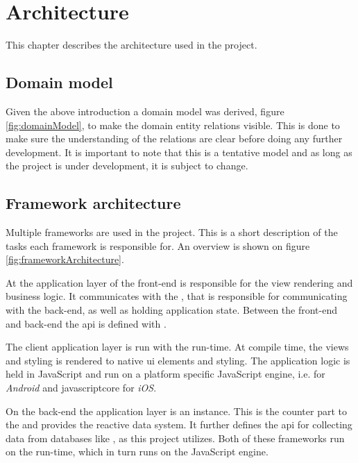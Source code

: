 \chapter{Architecture}
This chapter describes the architecture used in the project.

\section{Domain model}
Given the above introduction a domain model was derived, figure \ref{fig:domainModel}, to make the domain entity relations visible.
This is done to make sure the understanding of the relations are clear before doing any further development.
It is important to note that this is a tentative model and as long as the project is under development, it is subject to change.


\section{Framework architecture}
Multiple frameworks are used in the project.
This is a short description of the tasks each framework is responsible for.
An overview is shown on figure \ref{fig:frameworkArchitecture}.

At the application layer of the front-end  is responsible for the view rendering and business logic.
It communicates with the , that is responsible for communicating with the back-end, as well as holding application state.
Between the front-end and back-end the \gls{api} is defined with .

The client application layer is run with the  run-time.
At compile time, the  views and styling is rendered to native \gls{ui} elements and styling.
The application logic is held in JavaScript and run on a platform specific JavaScript engine, i.e.  for \textit{Android} and \gls{javascriptcore} for \textit{iOS}.

On the back-end the application layer is an  instance.
This is the counter part to the  and provides the reactive data system.
It further defines the \gls{api} for collecting data from databases like , as this project utilizes.
Both of these frameworks run on the  run-time, which in turn runs on the  JavaScript engine.



